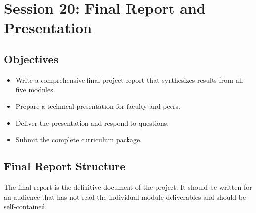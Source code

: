 \documentclass[11pt,letterpaper]{article}
\begin{document}
	\newpage
	\section{Session 20: Final Report and Presentation}
	\label{sec:report}

	\subsection{Objectives}

	\begin{itemize}[leftmargin=2em]
		\item Write a comprehensive final project report that synthesizes results from all five modules.
		\item Prepare a technical presentation for faculty and peers.
		\item Deliver the presentation and respond to questions.
		\item Submit the complete curriculum package.
	\end{itemize}

	\subsection{Final Report Structure}

	The final report is the definitive document of the project. It should be written for an audience that has not read the individual module deliverables and should be self-contained.
\end{document}

